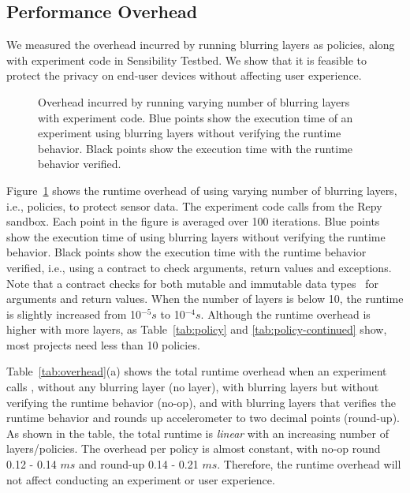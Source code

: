 \subsection{Performance Overhead}\label{sec-benchmark}

We measured the overhead incurred by running blurring layers as policies, 
along with experiment code in Sensibility Testbed. We show that it is 
feasible to protect the privacy on end-user devices without 
affecting user experience. 

\begin{figure}
\caption{\small Overhead incurred by running varying number of blurring 
layers with experiment code. Blue points show the execution time of 
an experiment using blurring layers without verifying the runtime behavior. 
Black points show the execution time with the runtime behavior verified. 
\label{fig-time}}
\end{figure}

Figure~\ref{fig-time} shows the runtime overhead of using varying number of 
blurring layers, i.e., policies, to protect sensor data. The experiment code 
calls  from the Repy sandbox. Each point in the 
figure is averaged over 100 iterations. Blue points show the execution time of 
using blurring layers without verifying the runtime behavior. Black points 
show the execution time with the runtime behavior verified, i.e., using a 
contract to check arguments, return values and exceptions. Note that a 
contract checks for both mutable and immutable data types~\cite{muta} 
for arguments and return values. When the number of layers is below 10, 
the runtime is slightly increased from 10$^{-5} s$ to 10$^{-4} s$. Although
the runtime overhead is higher with more layers, as Table~\ref{tab:policy} 
and \ref{tab:policy-continued} show, most projects need less than 10
policies. 

Table~\ref{tab:overhead}(a) shows the total runtime overhead when an experiment
calls , without any blurring layer (no layer), with blurring 
layers but without verifying the runtime behavior (no-op), and with blurring layers
that verifies the runtime behavior and rounds up accelerometer to two decimal 
points (round-up). As shown in the table, the total runtime is \textit{linear} with an 
increasing number of layers/policies. The overhead per policy is almost
constant, with no-op round 0.12 - 0.14 $ms$ and round-up 0.14 - 0.21 $ms$. 
Therefore, the runtime overhead will not affect conducting an 
experiment or user experience.


